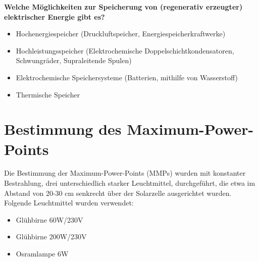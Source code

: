 \textbf{Welche Möglichkeiten zur Speicherung von (regenerativ erzeugter) elektrischer Energie
gibt es?\\}
\begin{itemize}
\item Hochenergiespeicher (Druckluftspeicher, Energiespeicherkraftwerke)
\end{itemize}
\begin{itemize}
\item Hochleistungsspeicher (Elektrochemische Doppelschichtkondensatoren, Schwungräder, Supraleitende Spulen)
\end{itemize} 
\begin{itemize}
\item Elektrochemische Speichersysteme (Batterien, mithilfe von Wasserstoff)
\end{itemize}
\begin{itemize}
\item Thermische Speicher
\end{itemize}

\section{Bestimmung des Maximum-Power-Points}
Die Bestimmung der Maximum-Power-Points (MMPs) wurden mit konstanter Bestrahlung, drei unterschiedlich starker Leuchtmittel, durchgeführt, die etwa im Abstand von 20-30 cm senkrecht über der Solarzelle ausgerichtet wurden. Folgende Leuchtmittel wurden verwendet:
\begin{itemize}
\item Glühbirne 60W/230V
\end{itemize}
\begin{itemize}
\item Glühbirne 200W/230V
\end{itemize}
\begin{itemize}
\item Osramlampe 6W
\end{itemize}

